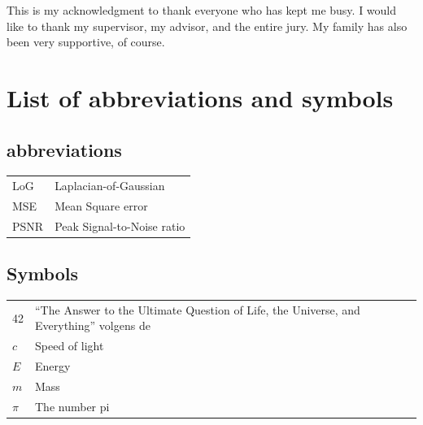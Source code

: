 \documentclass[master=ecws,masteroption=ss]{kulemt}
\begin{document}
\begin{preface}
This is my acknowledgment to thank everyone who has kept me busy.
I would like to thank my supervisor, my advisor, and the entire jury.
My family has also been very supportive, of course.
\end{preface}

\tableofcontents*

\begin{abstract}
  This \texttt{abstract} environment provides a summary of the work, which may or may not be extensive.
The intention is that this should be limited to 1 page.

  \lipsum[1]
\end{abstract}

\listoffiguresandtables
\chapter{List of abbreviations and symbols}
\section*{abbreviations}
\begin{flushleft}
  \renewcommand{\arraystretch}{1.1}
  \begin{tabularx}{\textwidth}{@{}p{12mm}X@{}}
    LoG   & Laplacian-of-Gaussian \\
    MSE   & Mean Square error \\
    PSNR  & Peak Signal-to-Noise ratio \\
  \end{tabularx}
\end{flushleft}
\section*{Symbols}
\begin{flushleft}
  \renewcommand{\arraystretch}{1.1}
  \begin{tabularx}{\textwidth}{@{}p{12mm}X@{}}
    42    & ``The Answer to the Ultimate Question of Life, the Universe,
            and Everything'' volgens de \cite{h2g2} \\
    $c$   & Speed of light \\
    $E$   & Energy \\
    $m$   & Mass \\
    $\pi$ & The number pi \\
  \end{tabularx}
\end{flushleft}
\end{document}
